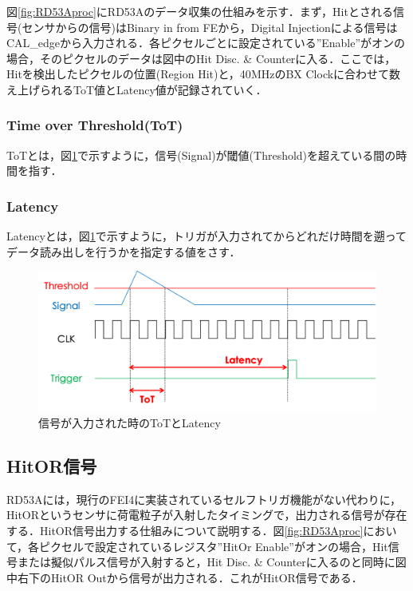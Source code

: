 図\ref{fig:RD53Aproc}にRD53Aのデータ収集の仕組みを示す．まず，Hitとされる信号(センサからの信号)はBinary in from FEから，Digital Injectionによる信号はCAL\_edgeから入力される．各ピクセルごとに設定されている''Enable''がオンの場合，そのピクセルのデータは図中のHit Disc. \& Counterに入る．ここでは，Hitを検出したピクセルの位置(Region Hit)と，40$\mathrm{MHz}$のBX Clockに合わせて数え上げられるToT値とLatency値が記録されていく．

\subsubsection*{Time over Threshold(ToT)}
ToTとは，図\ref{fig:tot}で示すように，信号(Signal)が閾値(Threshold)を超えている間の時間を指す．

\subsubsection*{Latency}
Latencyとは，図\ref{fig:tot}で示すように，トリガが入力されてからどれだけ時間を遡ってデータ読み出しを行うかを指定する値をさす．

\begin{figure}[h]
  \centering
  \includegraphics[width=13cm]{./figure/tot.png}
  \caption{信号が入力された時のToTとLatency}
  \label{fig:tot}
\end{figure}



\subsection{HitOR信号}
RD53Aには，現行のFEI4に実装されているセルフトリガ機能がない代わりに，HitORというセンサに荷電粒子が入射したタイミングで，出力される信号が存在する．HitOR信号出力する仕組みについて説明する．図\ref{fig:RD53Aproc}において，各ピクセルで設定されているレジスタ''HitOr Enable''がオンの場合，Hit信号または擬似パルス信号が入射すると，Hit Disc. \& Counterに入るのと同時に図中右下のHitOR Outから信号が出力される．これがHitOR信号である．\par

